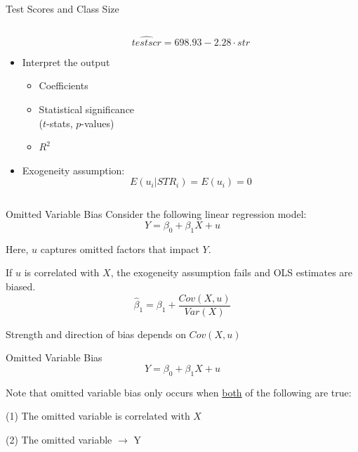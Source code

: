 \documentclass{./../div_teaching_slides}
\begin{document}
\begin{frame}{Test Scores and Class Size}
\begin{columns}[T]
\begin{column}{0.575\textwidth}
\begin{itemize}
$$ \hat{testscr} = 698.93 -2.28 \cdot str $$	
\item Interpret the output
\begin{itemize}
  \item Coefficients
  \item Statistical significance \\ ($t$-stats, $p$-values) 
  \item $R^2$
\end{itemize} 
\item Exogeneity assumption:\vspace{-0.5em}
$$ E(u_i|STR_i) = E(u_i) = 0  $$
\end{itemize}
\end{column}	
\end{columns}
\end{frame}

\begin{frame}{Omitted Variable Bias}
Consider the following linear regression model:
$$ Y = \beta_0 + \beta_1 X + u  $$

\begin{witemize}
  \item Here, $u$ captures omitted factors that impact $Y$.
  \item If $u$ is correlated with $X$, the exogeneity assumption fails and OLS estimates are biased.
  $$ \hat{\beta}_1 = \beta_1 +  \frac{Cov(X,u)}{Var(X)} $$
\item Strength and direction of bias depends on $Cov(X,u)$
\end{witemize}
\end{frame}


\begin{frame}{Omitted Variable Bias}
$$ Y = \beta_0 + \beta_1 X + u  $$
\vspace{0.1em}

Note that omitted variable bias only occurs when \underline{both} of the following are true: \\  \vspace{0.25em}
\begin{witemize}
  \item[(1)] The omitted variable is correlated with $X$
  \item[(2)] The omitted variable $\rightarrow$ Y
\end{witemize}
\end{frame}
\end{document}
